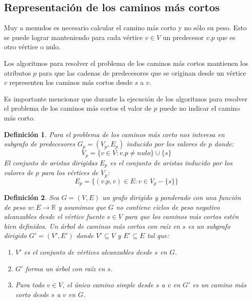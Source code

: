 \documentclass[12pt]{article}
\newcommand{\nl}{\vspace{0.3cm}}
\newtheorem{definition}{Definición}
\begin{document}
\subsection{Representación de los caminos más cortos}

\nl

Muy a menudos es necesario calcular el camino más corto y no sólo su peso. Esto se puede lograr manteniendo para cada vértice $v \in V$ un predecesor $v.p$ que es otro vértice o nulo. 

\nl

Los algoritmos para resolver el problema de los caminos más cortos mantienen los atributos $p$ para que las cadenas de predecesores que se originan desde un vértice $v$ representen los caminos más cortos desde $s$ a $v$.

\nl

Es importante mencionar que durante la ejecución de los algoritmos para resolver el problema de los caminos más cortos el valor de $p$ puede no indicar el camino más corto.

\begin{definition}
	Para el problema de los caminos más corto nos interesa en subgrafo de predecesores $G_p = (V_p, E_p)$ inducido por los valores de $p$ donde:
	$$ V_p = \{v \in V: v.p \neq nulo \} \cup \{s\} $$
	El conjunto de aristas dirigidas $E_p$ es el conjunto de aristas inducido por los valores de $p$ para los vértices de $V_p$:
	$$E_p = \{ (v.p, v) \in E: v \in V_p - \{ s \} \}$$
\end{definition}

\begin{definition}
	Sea $G = (V, E)$ un grafo dirigido y ponderado con una función de peso $w: E \rightarrow \mathbb{R} $ y asumimos que $G$ no contiene ciclos de peso negativo alcanzables desde el vértice fuente $s \in V$ para que los caminos más cortos estén bien definidos. Un árbol de caminos más cortos con raíz en $s$ es un subgrafo dirigido $G' = (V', E')$ donde $V' \subseteq V$ y $E' \subseteq E$ tal que:
	\begin{enumerate}
		\item $V'$ es el conjunto de vértices alcanzables desde $s$ en $G$.
		\item $G'$ forma un árbol con raíz en $s$.
		\item Para todo $v \in V$, el único camino simple desde $s$ a $v$ en $G'$ es un camino más corto desde $s$ a $v$ en $G$.
	\end{enumerate}
\end{definition}
\end{document}
